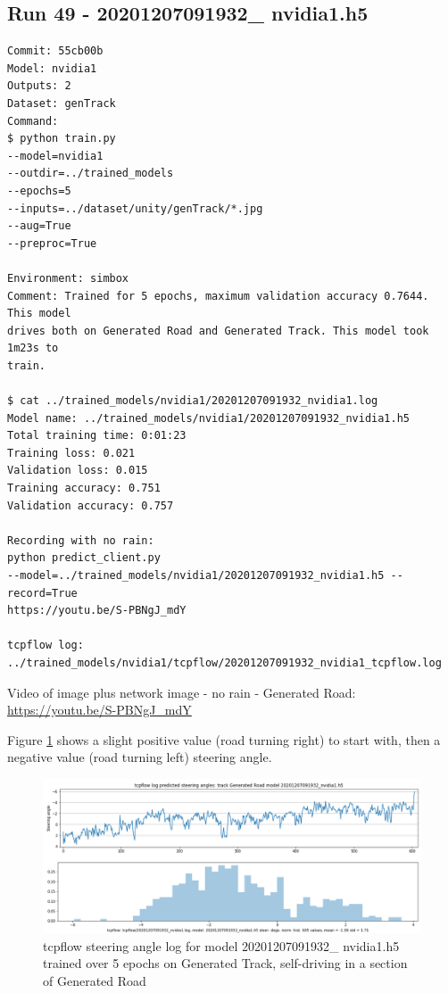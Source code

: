 \subsection{Run 49 - 20201207091932\_ nvidia1.h5}
\label{app_res:49}
\begin{verbatim}
Commit: 55cb00b
Model: nvidia1
Outputs: 2
Dataset: genTrack
Command: 
$ python train.py
--model=nvidia1
--outdir=../trained_models
--epochs=5
--inputs=../dataset/unity/genTrack/*.jpg
--aug=True
--preproc=True

Environment: simbox
Comment: Trained for 5 epochs, maximum validation accuracy 0.7644. This model
drives both on Generated Road and Generated Track. This model took 1m23s to
train.

$ cat ../trained_models/nvidia1/20201207091932_nvidia1.log
Model name: ../trained_models/nvidia1/20201207091932_nvidia1.h5
Total training time: 0:01:23
Training loss: 0.021
Validation loss: 0.015
Training accuracy: 0.751
Validation accuracy: 0.757

Recording with no rain:
python predict_client.py
--model=../trained_models/nvidia1/20201207091932_nvidia1.h5 --record=True
https://youtu.be/S-PBNgJ_mdY

tcpflow log:
../trained_models/nvidia1/tcpflow/20201207091932_nvidia1_tcpflow.log

\end{verbatim}

Video of image plus network image - no rain - Generated Road:  
\url{https://youtu.be/S-PBNgJ_mdY} 

Figure \ref{fig:20201207091932_nvidia1_tcpflow} shows a slight positive value (road turning right) to start with, then a negative value (road turning left) steering angle.

\begin{figure}[ht]
 \centering 
 \includegraphics[width=\textwidth]{Figures/20201207091932_nvidia1_tcpflow.png}
 \caption{tcpflow steering angle log for model 20201207091932\_ nvidia1.h5 trained over 5 epochs on Generated Track, self-driving in a section of Generated Road}
 \label{fig:20201207091932_nvidia1_tcpflow}
\end{figure}

